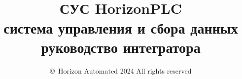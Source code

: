 

\author{\copyright\ Horizon Automated 2024 All rights reserved}
\title{\ \\\vspace{5mm}СУС HorizonPLC\\система управления и сбора
данных\\руководство интегратора}


\maketitle

\tableofcontents




